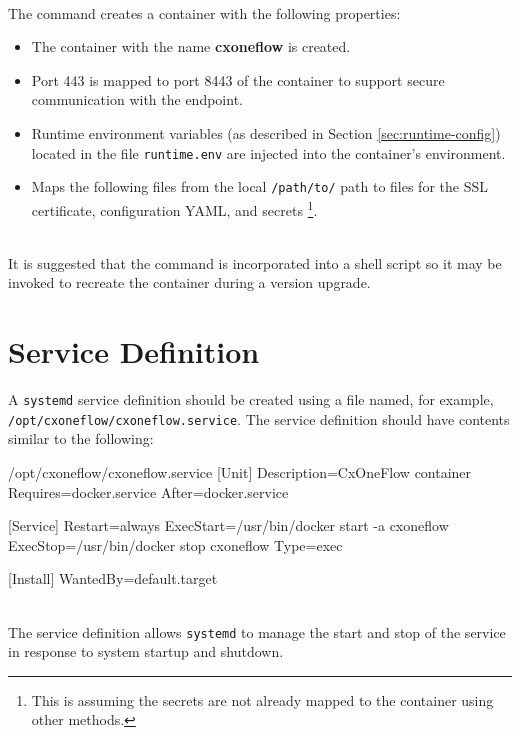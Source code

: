 \noindent\\The command creates a container with the following properties:

\begin{itemize}
    \item The container with the name \textbf{cxoneflow} is created.
    \item Port 443 is mapped to port 8443 of the container to support secure communication with
    the \cxoneflow endpoint.
    \item Runtime environment variables (as described in Section \ref{sec:runtime-config}) 
    located in the file \texttt{runtime.env} are injected into the container's environment.
    \item Maps the following files from the local \texttt{/path/to/} path to files for the SSL
    certificate, configuration YAML, and secrets
    \footnote{This is assuming the secrets are not already mapped to the container using other methods.}.
\end{itemize}

\noindent\\It is suggested that the command is incorporated into a shell script so it may be
invoked to recreate the container during a version upgrade.

\section{Service Definition}

A \texttt{systemd} service definition should be created using a file named, for example,
\\\texttt{/opt/cxoneflow/cxoneflow.service}.  The service definition should have contents
similar to the following:

\begin{code}{/opt/cxoneflow/cxoneflow.service}{}{}
[Unit]
Description=CxOneFlow container
Requires=docker.service
After=docker.service

[Service]
Restart=always
ExecStart=/usr/bin/docker start -a cxoneflow
ExecStop=/usr/bin/docker stop cxoneflow
Type=exec

[Install]
WantedBy=default.target
        
\end{code}

\noindent\\The service definition allows \texttt{systemd} to manage the start
and stop of the \cxoneflow service in response to system startup and shutdown.


